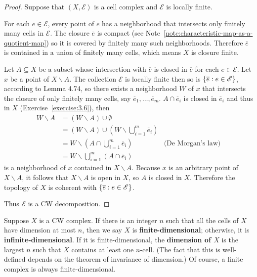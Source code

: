 \begin{proof}
	Suppose that \( (X, \mathscr{E}) \) is a cell complex and \( \mathscr{E} \) is locally finite.

	For each \( e\in \mathscr{E} \), every point of \( \overline{e} \) has a neighborhood that intersects only finitely many cells in \( \mathscr{E} \). The closure \( \overline{e} \) is compact (see Note~\ref{note:characteristic-map-as-a-quotient-map}) so it is covered by finitely many such neighborhoods. Therefore \( \overline{e} \) is contained in a union of finitely many cells, which means \( X \) is closure finite.

	Let \( A \subseteq X \) be a subset whose intersection with \( \overline{e} \) is closed in \( \overline{e} \) for each \( e\in \mathscr{E} \). Let \( x \) be a point of \( X\smallsetminus A \). The collection \( \mathscr{E} \) is locally finite then so is \( \left\{{ \overline{e} : e\in\mathscr{E} }\right\} \), according to Lemma 4.74, so there exists a neighborhood \( W \) of \( x \) that intersects the closure of only finitely many cells, say \( \overline{e}_{1}, \ldots, \overline{e}_{m} \). \( A \cap \overline{e}_{i} \) is closed in \( \overline{e}_{i} \) and thus in \( X \) (Exercise~\ref{exercise:3.6}), then
	\begin{align*}
		W\smallsetminus A & = (W\smallsetminus A) \cup \emptyset                                                                                   \\
		                  & = (W\smallsetminus A) \cup \left(W \smallsetminus \bigcup^{m}_{i=1}\overline{e}_{i} \right)                            \\
		                  & = W \smallsetminus \left(A \cap \bigcup^{m}_{i=1}\overline{e}_{i}\right)                    & \text{(De Morgan's law)} \\
		                  & = W \smallsetminus \bigcup^{m}_{i=1}(A\cap \overline{e}_{i})
	\end{align*}
	is a neighborhood of \( x \) contained in \( X\smallsetminus A \). Because \( x \) is an arbitrary point of \( X\smallsetminus A \), it follows that \( X\smallsetminus A \) is open in \( X \), so \( A \) is closed in \( X \). Therefore the topology of \( X \) is coherent with \( \left\{{ \overline{e} : e \in \mathscr{E} }\right\} \).

	Thus \( \mathscr{E} \) is a CW decomposition.
\end{proof}

Suppose \( X \) is a CW complex. If there is an integer \( n \) such that all the cells of \( X \) have dimension at most \( n \), then we say \( X \) is \textbf{finite-dimensional}; otherwise, it is \textbf{infinite-dimensional}. If it is finite-dimensional, the \textbf{dimension of \( X \)} is the largest \( n \) such that \( X \) contains at least one \( n \)-cell. (The fact that this is well-defined depends on the theorem of invariance of dimension.) Of course, a finite complex is always finite-dimensional.


